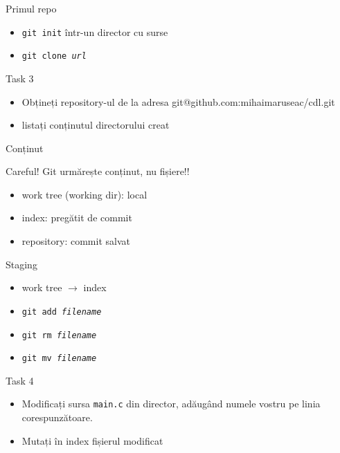 \documentclass{beamer}
\begin{document}
\begin{frame}{Primul repo}
  \begin{itemize}
    \item \texttt{git init} într-un director cu surse
    \item \texttt{git clone \textit{url}}
  \end{itemize}
  \pause
  \begin{alertblock}{Task 3}
    \begin{itemize}
      \item Obțineți repository-ul de la adresa
      git@github.com:mihaimaruseac/cdl.git
      \item listați conținutul directorului creat
    \end{itemize}
  \end{alertblock}
\end{frame}

\begin{frame}[label=Content]{Conținut}
  \begin{alertblock}{Careful!}
    Git urmărește conținut, nu fișiere!!
  \end{alertblock}
  \begin{itemize}
    \item work tree (working dir): local
    \item index: pregătit de commit
    \item repository: commit salvat
  \end{itemize}
\end{frame}

\begin{frame}{Staging}
  \begin{itemize}
    \item work tree $\rightarrow$ index
    \item \texttt{git add \textit{filename}}
    \item \texttt{git rm \textit{filename}}
    \item \texttt{git mv \textit{filename}}
  \end{itemize}
  \pause
  \begin{alertblock}{Task 4}
    \begin{itemize}
      \item Modificați sursa \texttt{main.c} din director, adăugând numele vostru pe linia
      corespunzătoare.
      \item Mutați în index fișierul modificat
    \end{itemize}
  \end{alertblock}
\end{frame}
\end{document}

